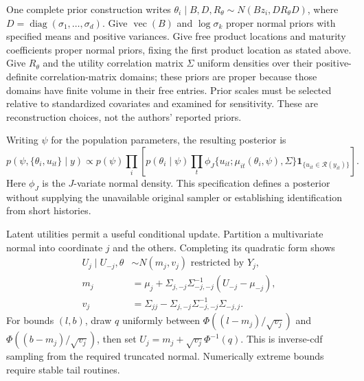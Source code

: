 One complete prior construction writes $\theta_i\mid B,D,R_\theta\sim N(Bz_i,DR_\theta D)$, where $D=\operatorname{diag}(\sigma_1,\ldots,\sigma_d)$. Give $\operatorname{vec}(B)$ and $\log\sigma_k$ proper normal priors with specified means and positive variances. Give free product locations and maturity coefficients proper normal priors, fixing the first product location as stated above. Give $R_\theta$ and the utility correlation matrix $\Sigma$ uniform densities over their positive-definite correlation-matrix domains; these priors are proper because those domains have finite volume in their free entries. Prior scales must be selected relative to standardized covariates and examined for sensitivity. These are reconstruction choices, not the authors' reported priors.

Writing $\psi$ for the population parameters, the resulting posterior is
\[
 p(\psi,\{\theta_i,u_{it}\}\mid y)\propto p(\psi)
 \prod_i\left[p(\theta_i\mid\psi)\prod_t
 \phi_J\{u_{it};\mu_{it}(\theta_i,\psi),\Sigma\}
 \mathbf1_{\{u_{it}\in\mathcal R(y_{it})\}}\right].
\]
Here $\phi_J$ is the $J$-variate normal density. This specification defines a posterior without supplying the unavailable original sampler or establishing identification from short histories.

Latent utilities permit a useful conditional update. Partition a multivariate normal into coordinate $j$ and the others. Completing its quadratic form shows
\begin{align*}
 U_j\mid U_{-j},\theta&\sim N(m_j,v_j)\text{ restricted by }Y_j,\\
 m_j&=\mu_j+\Sigma_{j,-j}\Sigma_{-j,-j}^{-1}(U_{-j}-\mu_{-j}),\\
 v_j&=\Sigma_{jj}-\Sigma_{j,-j}\Sigma_{-j,-j}^{-1}\Sigma_{-j,j}.
\end{align*}
For bounds $(l,b)$, draw $q$ uniformly between $\Phi((l-m_j)/\sqrt{v_j})$ and $\Phi((b-m_j)/\sqrt{v_j})$, then set $U_j=m_j+\sqrt{v_j}\Phi^{-1}(q)$. This is inverse-cdf sampling from the required truncated normal. Numerically extreme bounds require stable tail routines.

